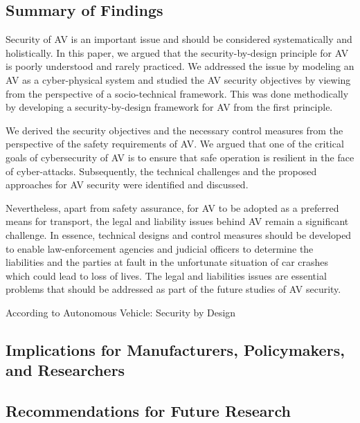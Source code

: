 \subsection{Summary of Findings}\label{subsec:summary-of-findings}





					Security of AV is an important issue and should be
considered systematically and holistically. In this paper, we
argued that the security-by-design principle for AV is poorly
understood and rarely practiced. We addressed the issue by
modeling an AV as a cyber-physical system and studied the
AV security objectives by viewing from the perspective of
a socio-technical framework. This was done methodically by
developing a security-by-design framework for AV from the
first principle.



					We derived the security objectives and the necessary control
measures from the perspective of the safety requirements of
AV. We argued that one of the critical goals of cybersecurity
of AV is to ensure that safe operation is resilient in the face
of cyber-attacks. Subsequently, the technical challenges and
the proposed approaches for AV security were identified and
discussed.



					Nevertheless, apart from safety assurance, for AV to be
adopted as a preferred means for transport, the legal and
liability issues behind AV remain a significant challenge. In
essence, technical designs and control measures should be
developed to enable law-enforcement agencies and judicial
officers to determine the liabilities and the parties at fault in the
unfortunate situation of car crashes which could lead to loss
of lives. The legal and liabilities issues are essential problems
that should be addressed as part of the future studies of AV
security.

According to Autonomous Vehicle: Security by Design




















\subsection{Implications for Manufacturers, Policymakers, and Researchers}\label{subsec:implications-for-manufacturers-policymakers-and-researchers}
\subsection{Recommendations for Future Research}\label{subsec:recommendations-for-future-research}
